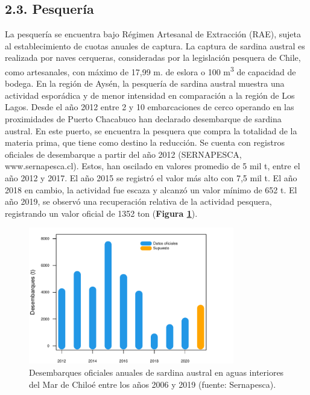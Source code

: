 \documentclass[
  spanish,
]{article}
\begin{document}
\hypertarget{pesqueruxeda}{%
\subsection{2.3. Pesquería}\label{pesqueruxeda}}

La pesquería se encuentra bajo Régimen Artesanal de Extracción (RAE),
sujeta al establecimiento de cuotas anuales de captura. La captura de
sardina austral es realizada por naves cerqueras, consideradas por la
legislación pesquera de Chile, como artesanales, con máximo de 17,99 m.
de eslora o 100 m\textsuperscript{3} de capacidad de bodega. En la
región de Aysén, la pesquería de sardina austral muestra una actividad
esporádica y de menor intensidad en comparación a la región de Los
Lagos. Desde el año 2012 entre 2 y 10 embarcaciones de cerco operando en
las proximidades de Puerto Chacabuco han declarado desembarque de
sardina austral. En este puerto, se encuentra la pesquera que compra la
totalidad de la materia prima, que tiene como destino la reducción. Se
cuenta con registros oficiales de desembarque a partir del año 2012
(SERNAPESCA, www.sernapesca.cl). Estos, han oscilado en valores promedio
de 5 mil t, entre el año 2012 y 2017. El año 2015 se registró el valor
más alto con 7,5 mil t. El año 2018 en cambio, la actividad fue escaza y
alcanzó un valor mínimo de 652 t. El año 2019, se observó una
recuperación relativa de la actividad pesquera, registrando un valor
oficial de 1352 ton (\textbf{Figura \ref{Fig2}}). \vspace{0.8cm}

\begin{figure}[htb!]
\centering
\includegraphics[width=0.8\textwidth]{Figuras/Fig2_InformeFinal-1.pdf}
\caption{Desembarques oficiales anuales de sardina austral en aguas interiores del Mar de Chiloé entre los años 2006 y 2019 (fuente: Sernapesca).}
\label{Fig2}
\end{figure}
\end{document}
